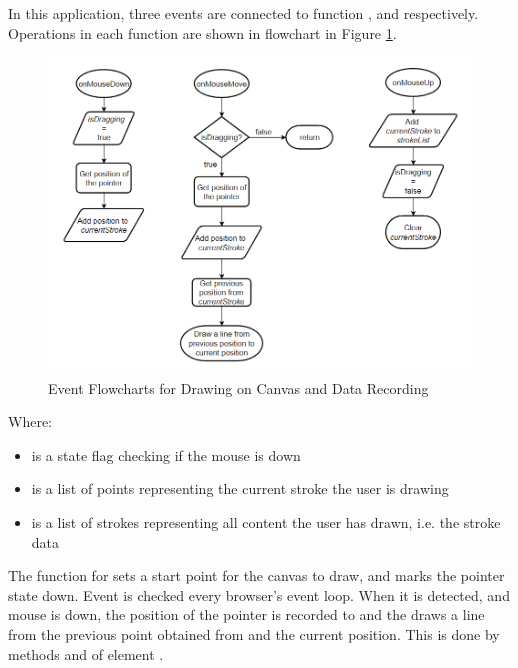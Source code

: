 \documentclass[12pt,twoside]{report}
\begin{document}
In this application, three events are connected to function
,   and 
respectively. Operations in each function are shown in flowchart in Figure
\ref{fig:flowchart1}.

\begin{figure}[h]
    \centering
    \includegraphics[width=\linewidth, frame]{figures/flowchart-op1.png}
    \caption{Event Flowcharts for Drawing on Canvas and Data Recording}
    \label{fig:flowchart1}
\end{figure}
Where:
\begin{itemize}
    \item {} is a state flag checking if the mouse is down
    \item {} is a list of points representing the current stroke the user is drawing
    \item {} is a list of strokes representing all content the user has drawn, i.e. the stroke data
\end{itemize}

The function for  sets a start point for the canvas to draw,
and marks the pointer state down. Event  is checked every
browser's event loop. When it is detected, and mouse is down, the position of
the pointer is recorded to  and the  draws a
line from the previous point obtained from  and the current
position. This is done by methods   and
 of element . 
\end{document}
